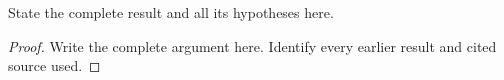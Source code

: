 \begin{proposition}\label{prop:answer-OP-XXX}
State the complete result and all its hypotheses here.
\end{proposition}
\begin{proof}
Write the complete argument here. Identify every earlier result and cited source used.
\end{proof}
